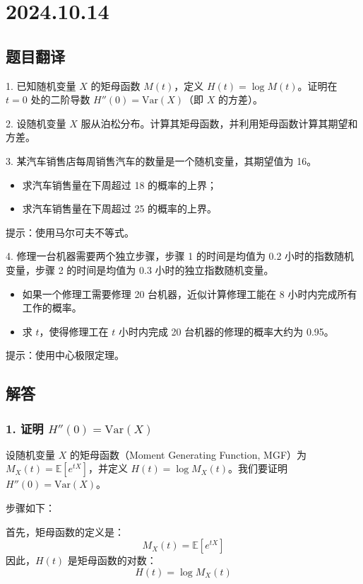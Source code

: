 \documentclass[UTF8]{report}
\theoremstyle{MyLineTheoremStyle} %
\theoremstyle{MyBlockTheoremStyle} %
\theoremstyle{MySubsubsectionStyle} %
\begin{document}
\chapter{2024.10.14}\thispagestyle{fancy}

\section*{题目翻译}

1. 已知随机变量 \( X \) 的矩母函数 \( M(t) \)，定义 \( H(t) = \log M(t) \)。证明在 \( t = 0 \) 处的二阶导数 \( H''(0) = \text{Var}(X) \)（即 \( X \) 的方差）。

2. 设随机变量 \( X \) 服从泊松分布。计算其矩母函数，并利用矩母函数计算其期望和方差。

3. 某汽车销售店每周销售汽车的数量是一个随机变量，其期望值为 16。
   \begin{itemize}
   \item 求汽车销售量在下周超过 18 的概率的上界；
   \item 求汽车销售量在下周超过 25 的概率的上界。
   \end{itemize}
   提示：使用马尔可夫不等式。

4. 修理一台机器需要两个独立步骤，步骤 1 的时间是均值为 0.2 小时的指数随机变量，步骤 2 的时间是均值为 0.3 小时的独立指数随机变量。
   \begin{itemize}
   \item 如果一个修理工需要修理 20 台机器，近似计算修理工能在 8 小时内完成所有工作的概率。
   \item 求 \( t \)，使得修理工在 \( t \) 小时内完成 20 台机器的修理的概率大约为 0.95。
   \end{itemize}
   提示：使用中心极限定理。

\section*{解答}

\subsection*{1. 证明 \( H''(0) = \text{Var}(X) \)}

设随机变量 \( X \) 的矩母函数（Moment Generating Function, MGF）为 \( M_X(t) = \mathbb{E}[e^{tX}] \)，并定义 \( H(t) = \log M_X(t) \)。我们要证明 \( H''(0) = \text{Var}(X) \)。

步骤如下：

首先，矩母函数的定义是：
\[
M_X(t) = \mathbb{E}[e^{tX}]
\]
因此，\( H(t) \) 是矩母函数的对数：
\[
H(t) = \log M_X(t)
\]
\end{document}
